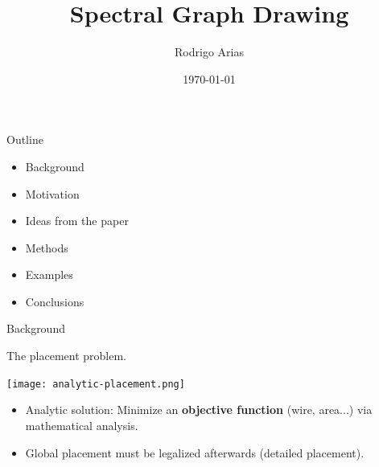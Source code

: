 \documentclass[serif, 12pt]{beamer}
\title{Spectral Graph Drawing}
\author{Rodrigo Arias}
\date{\today}
\begin{document}
%

\begin{frame}
	\maketitle
\end{frame}


\begin{frame}{Outline}

\begin{itemize}
\item Background
\item Motivation
\item Ideas from the paper
\item Methods
\item Examples
\item Conclusions
\end{itemize}

\end{frame}

\begin{frame}{Background}

The placement problem.

\begin{center}
\texttt{[image: analytic-placement.png]}
\end{center}

\begin{itemize}
\item Analytic solution: Minimize an \textbf{objective function} (wire, area...) 
via mathematical analysis.
\item Global placement must be legalized afterwards (detailed placement).
\end{itemize}

\end{frame}
\end{document}
